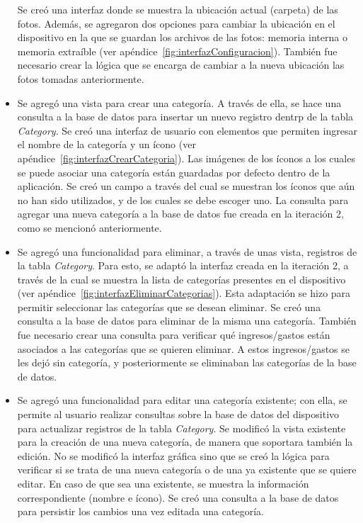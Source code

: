 \begin{itemize}
Se creó una interfaz donde se muestra la ubicación actual (carpeta) de las fotos. Además, se agregaron dos opciones para cambiar la ubicación en el dispositivo en la que se guardan los archivos de las fotos: memoria interna o memoria extraíble (ver apéndice~\ref{fig:interfazConfiguracion}). También fue necesario crear la lógica que se encarga de cambiar a la nueva ubicación las fotos tomadas anteriormente.
\item Se agregó una vista para crear una categoría. A través de ella, se hace una consulta a la base de datos para insertar un nuevo registro dentrp de la tabla \textit{Category}. Se creó una interfaz de usuario con elementos que permiten ingresar el nombre de la categoría y un ícono (ver apéndice~\ref{fig:interfazCrearCategoria}). Las imágenes de los íconos a los cuales se puede asociar una categoría están guardadas por defecto dentro de la aplicación. Se creó un campo a través del cual se muestran los íconos que aún no han sido utilizados, y de los cuales se debe escoger uno. La consulta para agregar una nueva categoría a la base de datos fue creada en la iteración 2, como se mencionó anteriormente.
\item Se agregó una funcionalidad para eliminar, a través de unas vista, registros de la tabla \textit{Category}. Para esto, se adaptó la interfaz creada en la iteración 2, a través de la cual se muestra la lista de categorías presentes en el dispositivo (ver apéndice~\ref{fig:interfazEliminarCategorias}). Esta adaptación se hizo para permitir seleccionar las categorías que se desean eliminar. Se creó una consulta a la base de datos para eliminar de la misma una categoría. También fue necesario crear una consulta para verificar qué ingresos/gastos están asociados a las categorías que se quieren eliminar. A estos ingresos/gastos se les dejó sin categoría, y posteriormente se eliminaban las categorías de la base de datos.
\item Se agregó una funcionalidad para editar una categoría existente; con ella, se permite al usuario realizar consultas sobre la base de datos del dispositivo para actualizar registros de la tabla \textit{Category}. Se modificó la vista existente para la creación de una nueva categoría, de manera que soportara también la edición. No se modificó la interfaz gráfica sino que se creó la lógica para verificar si se trata de una nueva categoría o de una ya existente que se quiere editar. En caso de que sea una existente, se muestra la información correspondiente (nombre e ícono). Se creó una consulta a la base de datos para persistir los cambios una vez editada una categoría.
\end{itemize}

